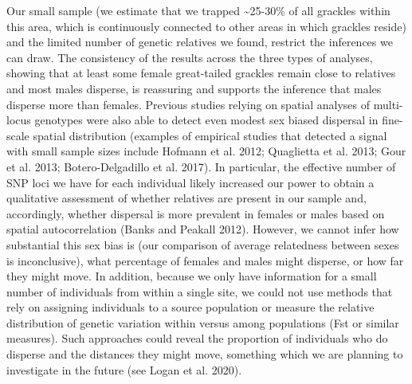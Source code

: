 \documentclass[
]{article}
\begin{document}
Our small sample (we estimate that we trapped \textasciitilde25-30\% of
all grackles within this area, which is continuously connected to other
areas in which grackles reside) and the limited number of genetic
relatives we found, restrict the inferences we can draw. The consistency
of the results across the three types of analyses, showing that at least
some female great-tailed grackles remain close to relatives and most
males disperse, is reassuring and supports the inference that males
disperse more than females. Previous studies relying on spatial analyses
of multi-locus genotypes were also able to detect even modest sex biased
dispersal in fine-scale spatial distribution (examples of empirical
studies that detected a signal with small sample sizes include Hofmann
et al. 2012; Quaglietta et al. 2013; Gour et al. 2013; Botero-Delgadillo
et al. 2017). In particular, the effective number of SNP loci we have
for each individual likely increased our power to obtain a qualitative
assessment of whether relatives are present in our sample and,
accordingly, whether dispersal is more prevalent in females or males
based on spatial autocorrelation (Banks and Peakall 2012). However, we
cannot infer how substantial this sex bias is (our comparison of average
relatedness between sexes is inconclusive), what percentage of females
and males might disperse, or how far they might move. In addition,
because we only have information for a small number of individuals from
within a single site, we could not use methods that rely on assigning
individuals to a source population or measure the relative distribution
of genetic variation within versus among populations (Fst or similar
measures). Such approaches could reveal the proportion of individuals
who do disperse and the distances they might move, something which we
are planning to investigate in the future (see Logan et al. 2020).
\end{document}
